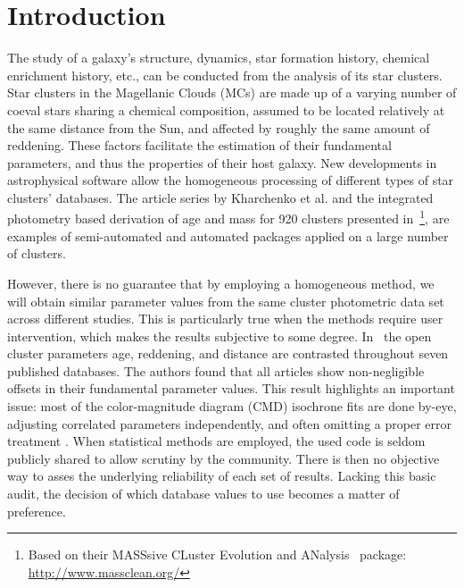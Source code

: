 \documentclass[referee]{aa}
\begin{document}

\maketitle
%

\section{Introduction}
\label{sec:intro}

The study of a galaxy's structure, dynamics, star formation history, chemical
enrichment history, etc., can be conducted from the analysis of its star
clusters.
Star clusters in the Magellanic Clouds (MCs) are made up of a varying number of
coeval stars sharing a chemical composition, assumed to be located
relatively at the same distance from the Sun, and affected by roughly the same
amount of reddening. These factors facilitate the estimation of
their fundamental parameters, and thus the properties of their host galaxy.
%
New developments in astrophysical software allow the homogeneous
processing of different types of star clusters' databases. The article series
by Kharchenko et al. 
\citep[see][and references therein]{Kharchenko_2005,Schmeja_2014}
and the integrated photometry based derivation of age and mass for 920 clusters
presented
in~\cite{Popescu_2012}\footnote{Based on their MASSsive CLuster Evolution and
ANalysis~\citep[MASSCLEAN,][]{Popescu_2009} package:
\url{http://www.massclean.org/}}, are examples of semi-automated and automated
packages applied on a large number of clusters.

However, there is no guarantee that by employing a homogeneous method, we will
obtain similar parameter values from the same cluster photometric
data set across different studies. This is particularly true when the methods
require user intervention, which makes the results subjective to some degree.
%
In~\cite{Netopil_2015} the open cluster parameters age, reddening, and distance
are contrasted throughout seven published databases. The authors found that all
articles show non-negligible offsets in their fundamental parameter values.
%
This result highlights an important issue: most of the color-magnitude diagram 
(CMD) isochrone fits are done by-eye, adjusting correlated parameters
independently, and often omitting a proper error treatment \citep[see]
[for a more detailed description of this problem]{vonHippel_2014}.
%
When statistical methods are employed, the used code is seldom publicly
shared to allow scrutiny by the community. There is then no objective way to
asses the underlying reliability of each set of results.
Lacking this basic audit, the decision of which database values to use
becomes a matter of preference.
\end{document}
